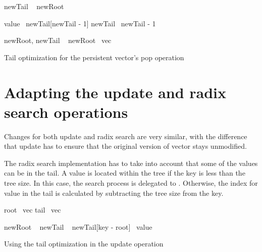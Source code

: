 \begin{listing}[!ht]

    \begin{algorithmic}[1]

        \State newTail \la\ 
        \State newRoot \la\ \nil{}

        \State value \la\ newTail[newTail - 1]
        \State newTail \la\ newTail - 1

            \State newRoot, newTail \la\ 
        \Else
            \State newRoot \la\ vec
        \EndIf

        \State \Return {}
        \EndFunction
    \end{algorithmic}

    \caption{Tail optimization for the persistent vector’s pop operation}
    \label{lst:tail-pop}
\end{listing}

\section{Adapting the update and radix search operations}
Changes for both update and radix search are very similar, with the difference that update has to ensure that the original version of vector stays unmodified.

The radix search implementation has to take into account that some of the values can be in the tail. A value is located within the tree if the key is less than the tree size. In this case, the search process is delegated to \treerrb{}. Otherwise, the index for value in the tail is calculated by subtracting the tree size from the key.

\begin{listing}[!ht]

    \begin{algorithmic}[1]

        \State root \la\ vec
        \State tail \la\ vec

            \State newRoot \la\ 
            \State \Return {}
        \Else
            \State newTail \la\ 
            \State newTail[key - root] \la\ value
            \State \Return {}
        \EndIf
        \EndFunction
    \end{algorithmic}

    \caption{Using the tail optimization in the update operation}
    \label{lst:tail-update}
\end{listing}

